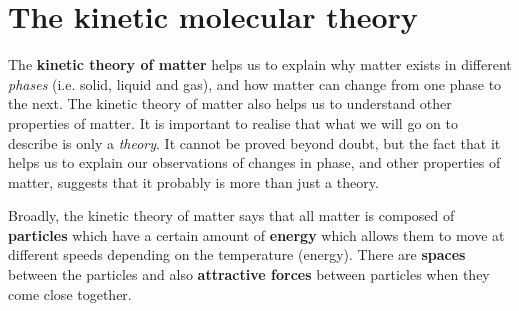          \section{The kinetic molecular theory}
    \nopagebreak
      \label{m38730*id308618}The \textbf{kinetic theory of matter} helps us to explain why matter exists in different \textsl{phases} (i.e. solid, liquid and gas), and how matter can change from one phase to the next. The kinetic theory of matter also helps us to understand other properties of matter. It is important to realise that what we will go on to describe is only a \textsl{theory}. It cannot be proved beyond doubt, but the fact that it helps us to explain our observations of changes in phase, and other properties of matter, suggests that it probably is more than just a theory.
\par 
      \label{m38730*id308641}Broadly, the kinetic theory of matter says that all matter is composed of \textbf{particles} which have a certain amount of \textbf{energy} which allows them to move at different speeds depending on the temperature (energy). There are \textbf{spaces} between the particles and also \textbf{attractive forces} between particles when they come close together.

